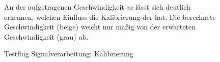 \begin{figure}[ht!]
\vspace{0.25cm}
\begin{center}
\caption{Testflug Signalverarbeitung: Kalibrierung}
\label{fig:FlightPoseVel}
\end{center}

\vspace{0.25cm}
An der aufgetragenen Geschwindigkeit \textit{vz} lässt sich deutlich erkennen, welchen Einfluss die Kalibrierung der  hat. Die berechnete Geschwindigkeit (beige) weicht nur mäßig von der erwarteten Geschwindigkeit (grau) ab.\\
\end{figure}



















